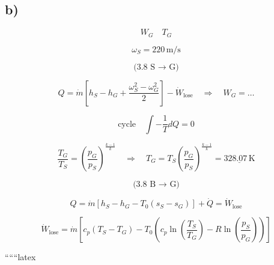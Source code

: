 

\subsection*{b)}

\[
W_G \quad T_G
\]

\[
\omega_S = 220 \, \text{m/s}
\]

\[
\text{(3.8 S $\rightarrow$ G)}
\]

\[
Q = \dot{m} \left[ h_S - h_G + \frac{\omega_S^2 - \omega_G^2}{2} \right] - \dot{W}_{\text{lose}} \quad \Rightarrow \quad W_G = \ldots
\]

\[
\text{cycle} \quad \int - \frac{1}{T} dQ = 0
\]

\[
\frac{T_G}{T_S} = \left( \frac{p_G}{p_S} \right)^{\frac{k-1}{k}} \quad \Rightarrow \quad T_G = T_S \left( \frac{p_G}{p_S} \right)^{\frac{k-1}{k}} = \underline{328.07 \, \text{K}}
\]

\[
\text{(3.8 B $\rightarrow$ G)}
\]

\[
Q = \dot{m} \left[ h_S - h_G - T_0 (s_S - s_G) \right] + \dot{Q} = \dot{W}_{\text{lose}}
\]

\[
\dot{W}_{\text{lose}} = \dot{m} \left[ c_p (T_S - T_G) - T_0 \left( c_p \ln \left( \frac{T_S}{T_G} \right) - R \ln \left( \frac{p_S}{p_G} \right) \right) \right]
\]

``````latex